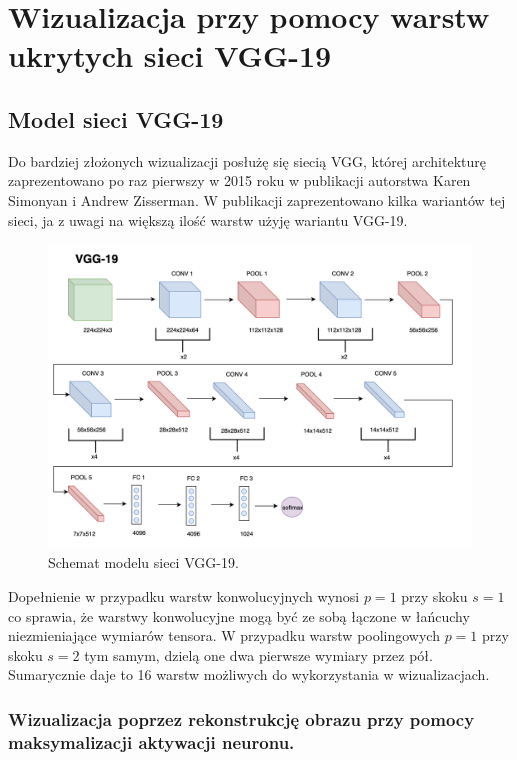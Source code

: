 \chapter{Wizualizacja przy pomocy warstw ukrytych sieci VGG-19}
\label{chap:vgg}
\section{Model sieci VGG-19}
\label{vgg-model}

Do bardziej złożonych wizualizacji posłużę się siecią VGG, której architekturę zaprezentowano po raz pierwszy w 2015 roku w publikacji autorstwa Karen Simonyan i 
Andrew Zisserman\cite{vggpaper}. W publikacji zaprezentowano kilka wariantów tej sieci, ja z uwagi na większą ilość warstw użyję wariantu VGG-19.

\begin{figure}[ht]
\centerline{\includegraphics[scale=0.5]{resources/vgg19.png}}
\caption{Schemat modelu sieci VGG-19.}
\label{fig:vgg19-schemat}
\end{figure}

Dopełnienie w przypadku warstw konwolucyjnych wynosi \(p=1\) przy skoku \(s=1\) co sprawia, że warstwy konwolucyjne mogą być ze sobą łączone w łańcuchy niezmieniające wymiarów tensora. W przypadku warstw poolingowych \(p=1\) przy skoku \(s=2\) tym samym, dzielą one dwa pierwsze wymiary przez pół. Sumarycznie daje to 16 warstw możliwych do wykorzystania w wizualizacjach.

\subsection{Wizualizacja poprzez rekonstrukcję obrazu przy pomocy maksymalizacji aktywacji neuronu.}
\label{vgg-mean-activation}

